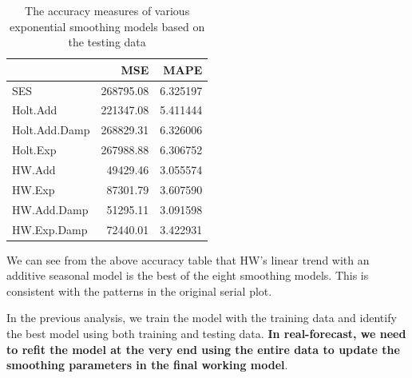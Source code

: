 \documentclass[
]{book}
\newenvironment{Shaded}{\begin{snugshade}}{\end{snugshade}}
\newcommand{\AttributeTok}[1]{\textcolor[rgb]{0.13,0.29,0.53}{#1}}
\newcommand{\DecValTok}[1]{\textcolor[rgb]{0.00,0.00,0.81}{#1}}
\newcommand{\FunctionTok}[1]{\textcolor[rgb]{0.13,0.29,0.53}{\textbf{#1}}}
\newcommand{\NormalTok}[1]{#1}
\newcommand{\OtherTok}[1]{\textcolor[rgb]{0.56,0.35,0.01}{#1}}
\newcommand{\SpecialCharTok}[1]{\textcolor[rgb]{0.81,0.36,0.00}{\textbf{#1}}}
\newcommand{\StringTok}[1]{\textcolor[rgb]{0.31,0.60,0.02}{#1}}
\begin{document}
\begin{table}

\caption{\label{tab:unnamed-chunk-239}The accuracy measures of various exponential smoothing models 
      based on the testing data}
\centering
\begin{tabular}[t]{l|r|r}
\hline
  & MSE & MAPE\\
\hline
SES & 268795.08 & 6.325197\\
\hline
Holt.Add & 221347.08 & 5.411444\\
\hline
Holt.Add.Damp & 268829.31 & 6.326006\\
\hline
Holt.Exp & 267988.88 & 6.306752\\
\hline
HW.Add & 49429.46 & 3.055574\\
\hline
HW.Exp & 87301.79 & 3.607590\\
\hline
HW.Add.Damp & 51295.11 & 3.091598\\
\hline
HW.Exp.Damp & 72440.01 & 3.422931\\
\hline
\end{tabular}
\end{table}

We can see from the above accuracy table that HW's linear trend with an additive seasonal model is the best of the eight smoothing models. This is consistent with the patterns in the original serial plot.

In the previous analysis, we train the model with the training data and identify the best model using both training and testing data. \textbf{In real-forecast, we need to refit the model at the very end using the entire data to update the smoothing parameters in the final working model}.

\begin{Shaded}
\end{Shaded}
\end{document}
